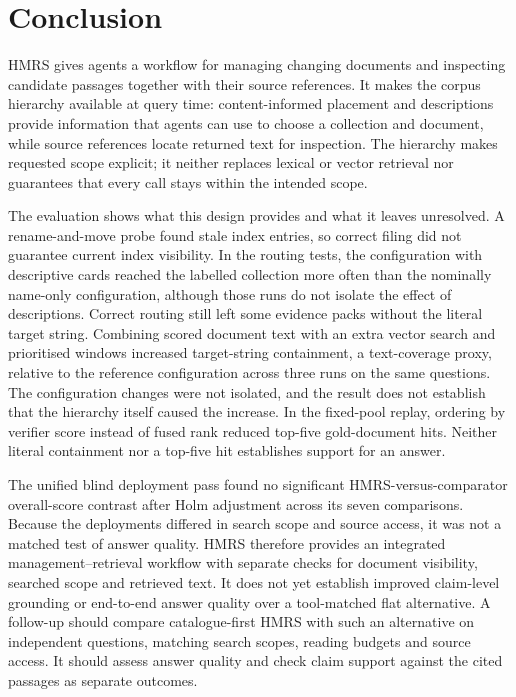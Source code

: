 \section{Conclusion}
\label{sec:conclusion}

HMRS gives agents a workflow for managing changing documents and inspecting
candidate passages together with their source references. It makes the corpus
hierarchy available at query time: content-informed placement and descriptions
provide information that agents can use to choose a collection and document,
while source references locate returned text for inspection. The hierarchy
makes requested scope explicit; it neither replaces lexical or vector retrieval
nor guarantees that every call stays within the intended scope.

The evaluation shows what this design provides and what it leaves unresolved.
A rename-and-move probe found stale index entries, so correct filing did not
guarantee current index visibility. In the routing tests,
the configuration with descriptive cards reached the labelled collection
more often than the nominally name-only configuration, although those
runs do not isolate the effect of descriptions. Correct routing still
left some evidence packs without the literal target string. Combining
scored document text with an extra vector search and prioritised windows
increased target-string containment, a text-coverage proxy, relative to the
reference configuration across three runs on the same questions. The
configuration changes were not isolated, and the result does not establish
that the hierarchy itself caused the increase. In the fixed-pool replay,
ordering by verifier score instead of fused rank reduced top-five
gold-document hits. Neither literal containment nor a top-five hit establishes
support for an answer.

The unified blind deployment pass found no significant HMRS-versus-comparator
overall-score contrast after Holm adjustment across its seven comparisons. Because the deployments differed in search scope
and source access, it was not a matched test of answer quality. HMRS therefore
provides an integrated management--retrieval workflow with separate checks for
document visibility, searched scope and retrieved text. It does not yet establish
improved claim-level grounding or end-to-end answer quality over a tool-matched
flat alternative. A follow-up should compare catalogue-first HMRS with
such an alternative on independent questions, matching search scopes,
reading budgets and source access. It should assess answer quality and
check claim support against the cited passages as separate outcomes.
